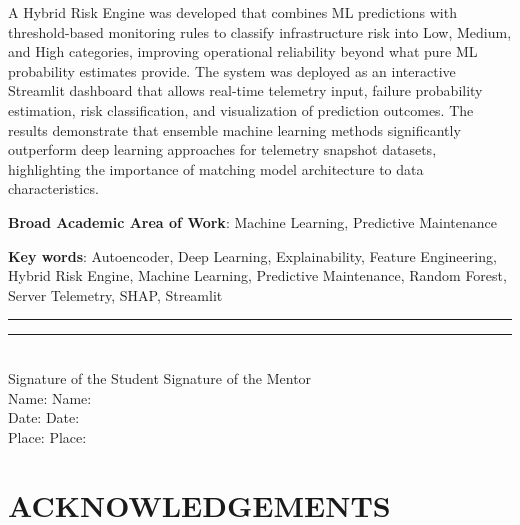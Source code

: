 \documentclass[12pt,letterpaper]{report}
\begin{document}
A Hybrid Risk Engine was developed that combines ML predictions with threshold-based monitoring rules to classify infrastructure risk into Low, Medium, and High categories, improving operational reliability beyond what pure ML probability estimates provide. The system was deployed as an interactive Streamlit dashboard that allows real-time telemetry input, failure probability estimation, risk classification, and visualization of prediction outcomes. The results demonstrate that ensemble machine learning methods significantly outperform deep learning approaches for telemetry snapshot datasets, highlighting the importance of matching model architecture to data characteristics.

\vspace{0.2in}

\noindent\textbf{Broad Academic Area of Work}: Machine Learning, Predictive Maintenance

\vspace{0.1in}

\noindent\textbf{Key words}: Autoencoder, Deep Learning, Explainability, Feature Engineering, Hybrid Risk Engine, Machine Learning, Predictive Maintenance, Random Forest, Server Telemetry, SHAP, Streamlit

\vspace{0.3in}

\noindent\rule{2.5in}{0.4pt} \hspace{1in} \noindent\rule{2.5in}{0.4pt}\\
Signature of the Student \hspace{0.6in} Signature of the Mentor\\[6pt]
Name: \underline{\hspace{1.5in}} \hspace{0.6in} Name: \underline{\hspace{1.5in}}\\[6pt]
Date: \hspace{2in} Date:\\[6pt]
Place: \hspace{1.9in} Place:

\newpage


\chapter*{ACKNOWLEDGEMENTS}
\end{document}
